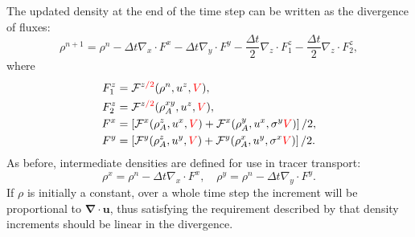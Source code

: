 \documentclass{ametsocV6.1}
\newcommand{\change}[1]{\textcolor{red}{#1}}
\begin{document}
The updated density at the end of the time step can be written as the divergence of fluxes:
\begin{equation}
    \rho^{n+1} = \rho^n - \Delta{t}\nabla_x \cdot F^x  - \Delta{t}\nabla_y \cdot F^y  - \frac{\Delta{t}}{2}\nabla_z \cdot F_1^z - \frac{\Delta{t}}{2}\nabla_z \cdot F_2^z,
\end{equation}
where
\begin{subequations}
\begin{align}
F_1^z & = \mathcal{F}^{z\change{/2}}(\rho^n,u^z,\change{V}), \\
F_2^z & = \mathcal{F}^{z\change{/2}}(\rho^{xy}_A,u^z,\change{V}), \\
F^x & = \left[ \mathcal{F}^x(\rho_A^z, u^x, \change{V}) + \mathcal{F}^x(\rho^y_A, u^x, \sigma^y\change{V}) \right]/2, \\
F^y & = \left[ \mathcal{F}^y(\rho_A^z, u^y, \change{V}) + \mathcal{F}^y(\rho^x_A, u^y, \sigma^x\change{V})\right]/2.
\end{align}
\end{subequations}
As before, intermediate densities are defined for use in tracer transport:
\begin{equation}
\rho^x = \rho^{n} - \Delta{t} \nabla_x\cdot F^x, \quad
\rho^y = \rho^{n} - \Delta{t} \nabla_y\cdot F^y. 
\end{equation}
If $\rho$ is initially a constant, over a whole time step the increment will be proportional to $\bm{\nabla\cdot u}$, thus satisfying the requirement described by \citet{melvin2024mixed} that density increments should be linear in the divergence.
\end{document}
